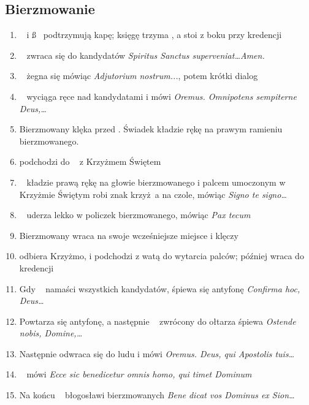\subsection{Bierzmowanie}
\label{sec:bierz}
\begin{enumerate}
      \item \dd~ i \ss~ podtrzymują kapę; księgę trzyma , a  stoi z boku
            przy kredencji
      \item \ii~ zwraca się do kandydatów \textit{Spiritus
                  Sanctus superveniat\dots Amen.}
      \item \ii~ żegna się mówiąc \textit{Adjutorium nostrum...}, potem krótki
            dialog
      \item \ii~ wyciąga ręce nad kandydatami i mówi
            \textit{Oremus. Omnipotens sempiterne Deus,\dots}
      \item Bierzmowany klęka przed \ii. Świadek kładzie rękę na
            prawym ramieniu bierzmowanego.
      \item {} podchodzi do \dd~ z Krzyżmem Świętem
      \item \ii~ kładzie prawą rękę na głowie bierzmowanego i palcem umoczonym w
            Krzyżmie Świętym robi znak krzyż a na czole, mówiąc \textit{Signo te
                  signo\dots}
      \item \ii~ uderza lekko w policzek bierzmowanego, mówiąc \textit{Pax tecum}
      \item Bierzmowany wraca na swoje wcześniejsze miejsce i klęczy
      \item {} odbiera Krzyżmo, i podchodzi z watą do wytarcia palców; później
            wraca do kredencji
      \item Gdy \ii~ namaści wszystkich kandydatów, śpiewa się antyfonę
            \textit{Confirma hoc, Deus\dots}
      \item Powtarza się antyfonę, a następnie \ii~ zwrócony do ołtarza śpiewa
            \textit{Ostende nobis, Domine,\dots}
      \item Następnie odwraca się do ludu i mówi \textit{Oremus. Deus, qui
                  Apostolis tuis\dots}
      \item \ii~ mówi \textit{Ecce sic benedicetur omnis homo, qui timet Dominum}
      \item Na końcu \ii~ błogosławi bierzmowanych
            \textit{Bene} \textcolor{red}{}
            \textit{dicat vos Dominus ex Sion\dots}
\end{enumerate}
